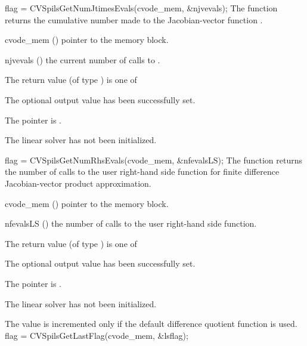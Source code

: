 {}
{
  flag = CVSpilsGetNumJtimesEvals(cvode\_mem, \&njvevals);
}
{
  The function  returns the
  cumulative number made to the Jacobian-vector function
  .
}
{
  \begin{args}
  \item[cvode\_mem] ()
    pointer to the {\cvode} memory block.
  \item[njvevals] ()
    the current number of calls to .
  \end{args}
}
{
  The return value  (of type ) is one of
  \begin{args}
  \item[\Id{CVSPILS\_SUCCESS}] 
    The optional output value has been successfully set.
  \item[\Id{CVSPILS\_MEM\_NULL}]
    The  pointer is .
  \item[\Id{CVSPILS\_LMEM\_NULL}]
    The {\cvspils} linear solver has not been initialized.
  \end{args}
}
{}
{
  flag = CVSpilsGetNumRhsEvals(cvode\_mem, \&nfevalsLS);
}
{
  The function  returns the
  number of calls to the user right-hand side function for
  finite difference Jacobian-vector product approximation.
}
{
  \begin{args}
  \item[cvode\_mem] ()
    pointer to the {\cvode} memory block.
  \item[nfevalsLS] ()
    the number of calls to the user right-hand side function.
  \end{args}
}
{
  The return value  (of type ) is one of
  \begin{args}
  \item[\Id{CVSPILS\_SUCCESS}] 
    The optional output value has been successfully set.
  \item[\Id{CVSPILS\_MEM\_NULL}]
    The  pointer is .
  \item[\Id{CVSPILS\_LMEM\_NULL}]
    The {\cvspils} linear solver has not been initialized.
  \end{args}
}
{
  The value  is incremented only if the default 
   difference quotient function is used.
}
{
  flag = CVSpilsGetLastFlag(cvode\_mem, \&lsflag);
}
